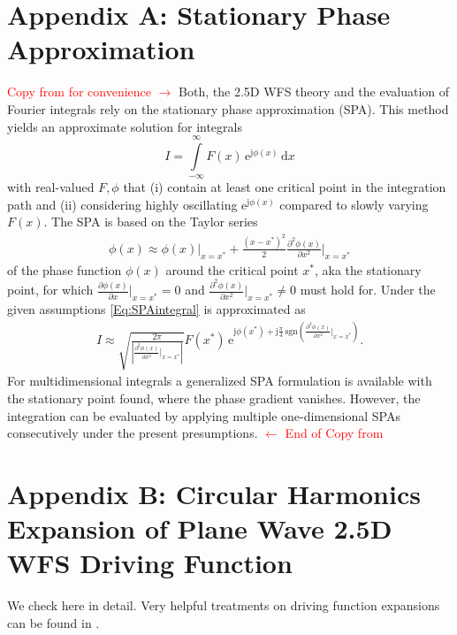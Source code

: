 \documentclass[a4paper,BCOR=15mm,10pt,twoside]{scrartcl}
\newcommand{\fscom}[2][red]{\textcolor{#1}{#2}}  %
\newcommand\e{\mathrm{e}}  %
\newcommand\im{\mathrm{j}}  %
\newcommand\fsd{\mathrm{d}}  %
\begin{document}
\section{Appendix A: Stationary Phase Approximation}
\fscom{Copy from \cite{Firtha2018} for convenience $\rightarrow$}
%
Both, the 2.5D WFS theory and the evaluation of Fourier integrals rely on the stationary phase approximation (SPA).
This method yields an approximate solution for integrals
\begin{equation}
\label{Eq:SPAintegral}
I = \int\limits_{-\infty}^{\infty} F(x) \, \e^{\im \phi(x)} \, \fsd x
\end{equation}
with real-valued $F,\phi$ that (i) contain at least one critical point in the integration path and (ii) considering highly oscillating $\e^{\im \phi(x)}$ compared to slowly varying $F(x)$. %
The SPA is based on the Taylor series
\begin{align}
\phi(x) \approx \phi(x)\big|_{x=x^*} + \frac{(x-x^*)^2}{2} \frac{\partial^2 \phi(x)}{\partial x^2}\bigg|_{x=x^*} 
\end{align} 
of the phase function $\phi(x)$ around the critical point $x^*$, aka the stationary point, for which $\frac{\partial \phi(x)}{\partial x}\big|_{x=x^*} = 0$ and $\frac{\partial^2 \phi(x)}{\partial x^2}\big|_{x=x^*} \neq 0$ must hold for.
Under the given assumptions \eqref{Eq:SPAintegral} is approximated as %
\begin{align}
\label{Eq:SPAResult}
I \approx \sqrt{\frac{2\pi}{| \frac{\partial^2 \phi(x)}{\partial x^2}\big|_{x=x^*}  |}} F(x^*) \, \e^{\im \phi(x^*) + \im \frac{\pi}{4}\,\mathrm{sgn}\left(  \frac{\partial^2 \phi(x)}{\partial x^2}\big|_{x=x^*}  \right)}.
\end{align}
For multidimensional integrals a generalized SPA formulation is available with the stationary point found, where the phase gradient vanishes. %
However, the integration can be evaluated by applying multiple one-dimensional SPAs consecutively under the present presumptions.
\fscom{$\leftarrow$ End of Copy from \cite{Firtha2018}}



\section{Appendix B: Circular Harmonics Expansion of Plane Wave 2.5D WFS Driving Function}


We check \cite[Ch. 4.4.2]{Ahrens2012} here in detail. Very helpful treatments on driving function expansions can be found in \cite{Hahn2016AES}.
\end{document}
